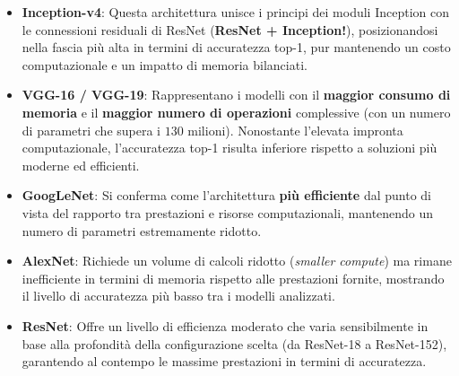 ﻿\documentclass[11pt, a4paper]{article}
\begin{document}
\begin{itemize}
    \item \textbf{Inception-v4}: Questa architettura unisce i principi dei moduli Inception con le connessioni residuali di ResNet (\textbf{ResNet + Inception!}), posizionandosi nella fascia più alta in termini di accuratezza top-1, pur mantenendo un costo computazionale e un impatto di memoria bilanciati.


    \item \textbf{VGG-16 / VGG-19}: Rappresentano i modelli con il \textbf{maggior consumo di memoria} e il \textbf{maggior numero di operazioni} complessive (con un numero di parametri che supera i $130$ milioni). Nonostante l'elevata impronta computazionale, l'accuratezza top-1 risulta inferiore rispetto a soluzioni più moderne ed efficienti.


    \item \textbf{GoogLeNet}: Si conferma come l'architettura \textbf{più efficiente} dal punto di vista del rapporto tra prestazioni e risorse computazionali, mantenendo un numero di parametri estremamente ridotto.


    \item \textbf{AlexNet}: Richiede un volume di calcoli ridotto (\emph{smaller compute}) ma rimane inefficiente in termini di memoria rispetto alle prestazioni fornite, mostrando il livello di accuratezza più basso tra i modelli analizzati.


    \item \textbf{ResNet}: Offre un livello di efficienza moderato che varia sensibilmente in base alla profondità della configurazione scelta (da ResNet-18 a ResNet-152), garantendo al contempo le massime prestazioni in termini di accuratezza.

\end{itemize}
\end{document}
